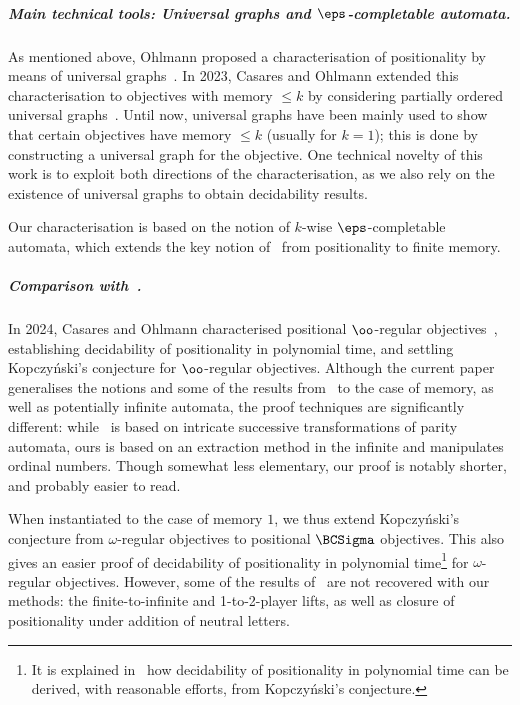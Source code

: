 \subparagraph{Main technical tools: Universal graphs and $\eps$-completable automata.}
As mentioned above, Ohlmann proposed a characterisation of positionality by means of universal graphs~\cite{Ohlmann23}.
In 2023, Casares and Ohlmann extended this characterisation to objectives with memory $\leq k$ by considering partially ordered universal graphs~\cite{CO25LMCS}.
Until now, universal graphs have been mainly used to show that certain objectives have memory $\leq k$ (usually for $k=1$); this is done by constructing a universal graph for the objective.
One technical novelty of this work is to exploit both directions of the characterisation, as we also rely on the existence of universal graphs to obtain decidability results.

Our characterisation is based on the notion of $k$-wise $\eps$-completable automata, which extends the key notion of~\cite{CO24Positional} from positionality to finite memory.  

\subparagraph*{Comparison with~\cite{CO24Positional}.}
In 2024, Casares and Ohlmann characterised positional $\oo$-regular objectives~\cite{CO24Positional}, establishing decidability of positionality in polynomial time, and settling Kopczyński's conjecture for $\oo$-regular objectives.
Although the current paper generalises the notions and some of the results from~\cite{CO24Positional} to the case of memory, as well as potentially infinite automata, the proof techniques are significantly different: while~\cite{CO24Positional} is based on intricate successive transformations of parity automata, ours is based on an extraction method in the infinite and manipulates ordinal numbers.
Though somewhat less elementary, our proof is notably shorter, and probably easier to read.

When instantiated to the case of memory $1$, we thus extend Kopczyński's conjecture from $\omega$-regular objectives to positional $\BCSigma$ objectives.
This also gives an easier proof of decidability of positionality in polynomial time\footnote{It is explained in~\cite[Theorem~5.3]{CO24Positional} how decidability of positionality in polynomial time can be derived, with reasonable efforts, from Kopczy\'nski's conjecture.} for $\omega$-regular objectives.
However, some of the results of~\cite{CO24Positional} are not recovered with our methods: the finite-to-infinite and 1-to-2-player lifts, as well as closure of positionality under addition of neutral letters.